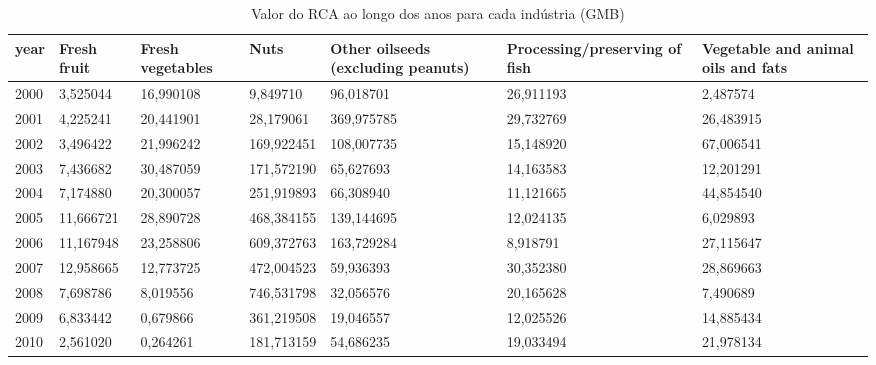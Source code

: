 \begin{table}
\centering
\caption{Valor do RCA ao longo dos anos para cada indústria (GMB)}
\begin{tabular}{p{1cm}p{2cm}p{2cm}p{2cm}p{2cm}p{2cm}p{2cm}}
\toprule
 year &  Fresh fruit &  Fresh vegetables &       Nuts &  Other oilseeds (excluding peanuts) &  Processing/preserving of fish &  Vegetable and animal oils and fats \\
\midrule
 2000 &     3,525044 &         16,990108 &   9,849710 &                           96,018701 &                      26,911193 &                            2,487574 \\
 2001 &     4,225241 &         20,441901 &  28,179061 &                          369,975785 &                      29,732769 &                           26,483915 \\
 2002 &     3,496422 &         21,996242 & 169,922451 &                          108,007735 &                      15,148920 &                           67,006541 \\
 2003 &     7,436682 &         30,487059 & 171,572190 &                           65,627693 &                      14,163583 &                           12,201291 \\
 2004 &     7,174880 &         20,300057 & 251,919893 &                           66,308940 &                      11,121665 &                           44,854540 \\
 2005 &    11,666721 &         28,890728 & 468,384155 &                          139,144695 &                      12,024135 &                            6,029893 \\
 2006 &    11,167948 &         23,258806 & 609,372763 &                          163,729284 &                       8,918791 &                           27,115647 \\
 2007 &    12,958665 &         12,773725 & 472,004523 &                           59,936393 &                      30,352380 &                           28,869663 \\
 2008 &     7,698786 &          8,019556 & 746,531798 &                           32,056576 &                      20,165628 &                            7,490689 \\
 2009 &     6,833442 &          0,679866 & 361,219508 &                           19,046557 &                      12,025526 &                           14,885434 \\
 2010 &     2,561020 &          0,264261 & 181,713159 &                           54,686235 &                      19,033494 &                           21,978134 \\

\end{tabular}
\end{table}
